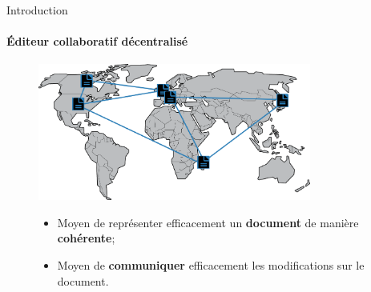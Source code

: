 \begin{frame}{Introduction}\framesubtitle{Éditeur collaboratif décentralisé}
  \begin{figure}
    \begin{center}
      \includegraphics[width=0.8\textwidth]{img/world.png}
    \end{center}
    
    
    \begin{itemize}
    \item Moyen de représenter efficacement un \textbf{document} de manière
      \textbf{cohérente};
    \item Moyen de \textbf{communiquer} efficacement les modifications sur le
      document.
    \end{itemize}

  \end{figure}

\end{frame}


